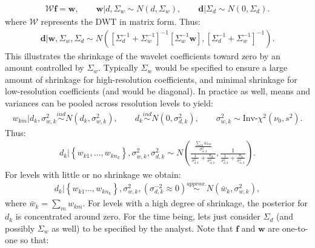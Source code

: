 \documentclass[a4paper,11pt]{article}
\newcommand{\simind}{\stackrel{ind}{\sim}}
\newcommand{\simapprox}{\stackrel{approx.}{\sim}}
\begin{document}
\begin{align*}
 \mathcal{W}\mathbf{f} = \mathbf{w} , \qquad 
  \mathbf{w}|d,\Sigma_{w} \sim N\left(d,\Sigma_{w}\right) , \qquad
  \mathbf{d}|\Sigma_{d} \sim N\left(0,\Sigma_{d}\right) .
\end{align*}
where $\mathcal{W}$ represents the DWT in matrix form. Thus:
\begin{align*}
  \mathbf{d} | \mathbf{w}, \Sigma_{w}, \Sigma_{d} \sim
   N\left(\left[\Sigma_{d}^{-1}+\Sigma_{w}^{-1}\right]^{-1}\left[\Sigma_{w}^{-1}\mathbf{w}\right],\left[\Sigma_{d}^{-1}+\Sigma_{w}^{-1}\right]^{-1}\right) .
\end{align*}
This illustrates the shrinkage of the wavelet coefficients toward zero by an amount controlled by $\Sigma_{w}$. Typically $\Sigma_{w}$ would be specified to ensure a large amount of shrinkage for high-resolution coefficients, and minimal shrinkage for low-resolution coefficients (and would be diagonal). In practice as well, means and variances can be pooled across resolution levels to yield: 
\begin{align*}
  w_{km} | d_{k},\sigma^{2}_{w,k} \simind N\left(d_{k},\sigma^{2}_{w,k}\right) , \qquad
  d_{k} \simind N\left(0,\sigma^{2}_{d,k}\right) , \qquad 
  \sigma^{2}_{w,k} \sim \textrm{Inv-}\chi^{2}(\nu_{0},s^{2}) .
\end{align*}
Thus:
\begin{align*}
  d_{k} | \left\{w_{k1},\ldots,w_{kn_{k}}\right\}, \sigma^{2}_{w,k}, \sigma^{2}_{d,k} \sim
   N\left(\frac{ \frac{\sum_{m}w_{km}}{\sigma^{2}_{w,k}} }{ {\frac{1}{\sigma^{2}_{d,k}}+\frac{n_{k}}{\sigma_{w,k}^{2}}} }, 
   \frac{1}{\frac{1}{\sigma^{2}_{d,k}}+\frac{n_{k}}{\sigma_{w,k}^{2}}}\right) .
\end{align*}
For levels with little or no shrinkage we obtain:
\begin{align*}
  d_{k} | \left\{w_{k1}\ldots,w_{kn_{k}}\right\}, \sigma^{2}_{w,k}, (\sigma^{-2}_{d,k}\approx{}0) \simapprox
   N\left(\bar{w}_{k},\sigma_{w,k}^{2}\right) ,
\end{align*}
where $\bar{w}_{k}=\sum_{m}w_{km}$. For levels with a high degree of shrinkage, the posterior for $d_{k}$ is concentrated around zero. For the time being, lets just consider $\Sigma_{d}$ (and possibly $\Sigma_{w}$ as well) to be specified by the analyst. Note that $\mathbf{f}$ and $\mathbf{w}$ are one-to-one so that:
\end{document}
